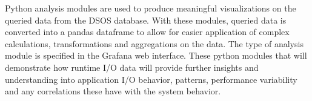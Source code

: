 Python analysis modules are used to produce meaningful visualizations on the queried data from the DSOS database. With these modules, queried data is converted into a pandas dataframe to allow for easier application of complex calculations, transformations and aggregations on the data. The type of analysis module is specified in the Grafana web interface. These python modules that \Darshan{} will demonstrate how runtime I/O data will provide further insights and understanding into application I/O behavior, patterns, performance variability and any correlations these have with the system behavior.   


